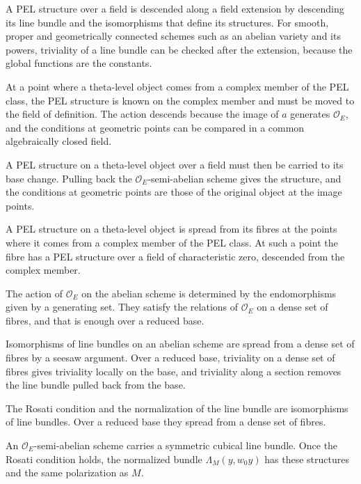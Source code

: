 A PEL structure over a field is descended along a field extension by descending its line bundle and the isomorphisms
that define its structures. For smooth, proper and geometrically connected schemes such as an abelian variety and its
powers, triviality of a line bundle can be checked after the extension, because the global functions are the constants.

At a point where a theta-level object comes from a complex member of the PEL class, the PEL structure is known on the
complex member and must be moved to the field of definition. The action descends because the image of $a$ generates
$\mathcal O_E$, and the conditions at geometric points can be compared in a common algebraically closed field.

A PEL structure on a theta-level object over a field must then be carried to its base change. Pulling back the
$\mathcal O_E$-semi-abelian scheme gives the structure, and the conditions at geometric points are those of the original
object at the image points.

A PEL structure on a theta-level object is spread from its fibres at the points where it comes from a complex member of
the PEL class. At such a point the fibre has a PEL structure over a field of characteristic zero, descended from the
complex member.

The action of $\mathcal O_E$ on the abelian scheme is determined by the endomorphisms given by a generating set. They
satisfy the relations of $\mathcal O_E$ on a dense set of fibres, and that is enough over a reduced base.

Isomorphisms of line bundles on an abelian scheme are spread from a dense set of fibres by a seesaw argument. Over a
reduced base, triviality on a dense set of fibres gives triviality locally on the base, and triviality along a section
removes the line bundle pulled back from the base.

The Rosati condition and the normalization of the line bundle are isomorphisms of line bundles. Over a reduced base
they spread from a dense set of fibres.

An $\mathcal O_E$-semi-abelian scheme carries a symmetric cubical line bundle. Once the Rosati condition holds, the
normalized bundle $\Lambda_M(y,w_0y)$ has these structures and the same polarization as $M$.

